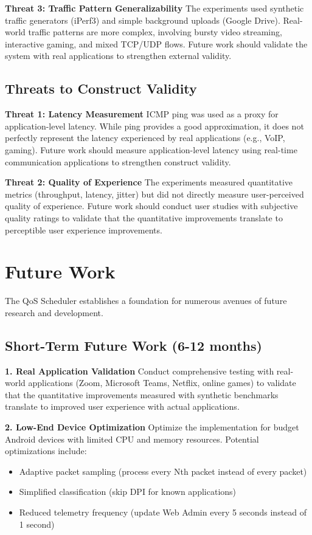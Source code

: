 \textbf{Threat 3: Traffic Pattern Generalizability}
The experiments used synthetic traffic generators (iPerf3) and simple background uploads (Google Drive). Real-world traffic patterns are more complex, involving bursty video streaming, interactive gaming, and mixed TCP/UDP flows. Future work should validate the system with real applications to strengthen external validity.

\subsection{Threats to Construct Validity}

\textbf{Threat 1: Latency Measurement}
ICMP ping was used as a proxy for application-level latency. While ping provides a good approximation, it does not perfectly represent the latency experienced by real applications (e.g., VoIP, gaming). Future work should measure application-level latency using real-time communication applications to strengthen construct validity.

\textbf{Threat 2: Quality of Experience}
The experiments measured quantitative metrics (throughput, latency, jitter) but did not directly measure user-perceived quality of experience. Future work should conduct user studies with subjective quality ratings to validate that the quantitative improvements translate to perceptible user experience improvements.

\section{Future Work}
\label{sec:future_work}

The QoS Scheduler establishes a foundation for numerous avenues of future research and development.

\subsection{Short-Term Future Work (6-12 months)}

\textbf{1. Real Application Validation}
Conduct comprehensive testing with real-world applications (Zoom, Microsoft Teams, Netflix, online games) to validate that the quantitative improvements measured with synthetic benchmarks translate to improved user experience with actual applications.

\textbf{2. Low-End Device Optimization}
Optimize the implementation for budget Android devices with limited CPU and memory resources. Potential optimizations include:
\begin{itemize}
    \item Adaptive packet sampling (process every Nth packet instead of every packet)
    \item Simplified classification (skip DPI for known applications)
    \item Reduced telemetry frequency (update Web Admin every 5 seconds instead of 1 second)
\end{itemize}

